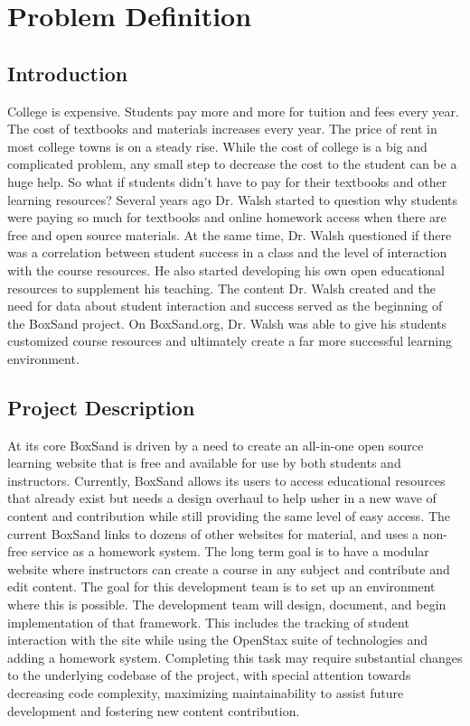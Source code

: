 \documentclass[onecolumn, draftclsnofoot,10pt, compsoc]{IEEEtran}
\begin{document}
\section{Problem Definition}

\subsection{Introduction}
College is expensive. Students pay more and more for tuition and fees every year. The cost of textbooks and materials increases every year. The price of rent in most college towns is on a steady rise. While the cost of college is a big and complicated problem, any small step to decrease the cost to the student can be a huge help. So what if students didn’t have to pay for their textbooks and other learning resources? 
Several years ago Dr. Walsh started to question why students were paying so much for textbooks and online homework access when there are free and open source materials. At the same time, Dr. Walsh questioned if there was a correlation between student success in a class and the level of interaction with the course resources. He also started developing his own open educational resources to supplement his teaching. The content Dr. Walsh created and the need for data about student interaction and success served as the beginning of the BoxSand project. On BoxSand.org, Dr. Walsh was able to give his students customized course resources and ultimately create a far more successful learning environment. 

\subsection{Project Description}
At its core BoxSand is driven by a need to create an all-in-one open source learning website that is free and available for use by both students and instructors. Currently, BoxSand allows its users to access educational resources that already exist but needs a design overhaul to help usher in a new wave of content and contribution while still providing the same level of easy access. The current BoxSand links to dozens of other websites for material, and uses a non-free service as a homework system. The long term goal is to have a modular website where instructors can create a course in any subject and contribute and edit content. The goal for this development team is to set up an environment where this is possible. The development team will design, document, and begin implementation of that framework. This includes the tracking of student interaction with the site while using the OpenStax suite of technologies and adding a homework system. Completing this task may require substantial changes to the underlying codebase of the project, with special attention towards decreasing code complexity, maximizing maintainability to assist future development and fostering new content contribution.
\end{document}
